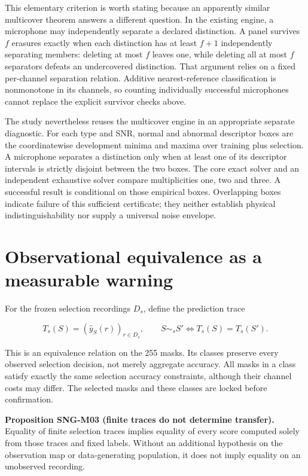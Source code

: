 \documentclass[
  11pt,
  a4paper,
]{report}
\let\singularitytexttt\texttt
\renewcommand{\texttt}[1]{\singularitytexttt{\seqsplit{#1}}}
\begin{document}
This elementary criterion is worth stating because an apparently similar
multicover theorem answers a different question. In the existing
\texttt{singularity.robust\_coverage} engine, a microphone may
independently separate a declared distinction. A panel survives \(f\)
erasures exactly when each distinction has at least \(f+1\)
independently separating members: deleting at most \(f\) leaves one,
while deleting all at most \(f\) separators defeats an undercovered
distinction. That argument relies on a fixed per-channel separation
relation. Additive nearest-reference classification is nonmonotone in
its channels, so counting individually successful microphones cannot
replace the explicit survivor checks above.

The study nevertheless reuses the multicover engine in an appropriate
separate diagnostic. For each type and SNR, normal and abnormal
descriptor boxes are the coordinatewise development minima and maxima
over training plus selection. A microphone separates a distinction only
when at least one of its descriptor intervals is strictly disjoint
between the two boxes. The core exact solver and an independent
exhaustive solver compare multiplicities one, two and three. A
successful result is conditional on those empirical boxes. Overlapping
boxes indicate failure of this sufficient certificate; they neither
establish physical indistinguishability nor supply a universal noise
envelope.

\hypertarget{observational-equivalence-as-a-measurable-warning}{%
\section{Observational equivalence as a measurable
warning}\label{observational-equivalence-as-a-measurable-warning}}

For the frozen selection recordings \(D_s\), define the prediction trace

\[
T_s(S)=(\widehat y_S(r))_{r\in D_s},\qquad
S\sim_s S'\iff T_s(S)=T_s(S').
\]

This is an equivalence relation on the 255 masks. Its classes preserve
every observed selection decision, not merely aggregate accuracy. All
masks in a class satisfy exactly the same selection accuracy
constraints, although their channel costs may differ. The selected masks
and these classes are locked before confirmation.

\textbf{Proposition SNG-M03 (finite traces do not determine transfer).}
Equality of finite selection traces implies equality of every score
computed solely from those traces and fixed labels. Without an
additional hypothesis on the observation map or data-generating
population, it does not imply equality on an unobserved recording.
\end{document}
